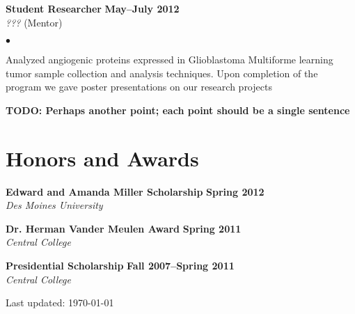 \documentclass[10pt,letterpaper]{article}
\renewenvironment{itemize}{
  \begin{list}{}{
      \setlength{\leftmargin}{1.5em}
      \setlength{\itemsep}{0.25em}
      \setlength{\parskip}{0pt}
      \setlength{\parsep}{0.25em}
    }
  }{
  \end{list}
}
\newenvironment{bitemize}{
  \begin{list}{$\bullet$}{
      \setlength{\leftmargin}{1.5em}
      \setlength{\itemsep}{0.25em}
      \setlength{\parskip}{0pt}
      \setlength{\parsep}{0.25em}
    }
  }{
  \end{list}
}
\begin{document}
\begin{itemize}
\item \textbf{Student Researcher} \hfill \textbf{May--July 2012}\\
  \textit{???} (Mentor)
  \begin{bitemize}
  \item Analyzed angiogenic proteins expressed in Glioblastoma
    Multiforme learning tumor sample collection and analysis
    techniques. Upon completion of the program we gave poster
    presentations on our research projects
  \item \textbf{TODO: Perhaps another point; each point should be a
    single sentence}
  \end{bitemize}
\end{itemize}

\section*{Honors and Awards}
\begin{itemize}
\item \textbf{Edward and Amanda Miller Scholarship} \hfill \textbf{Spring 2012}\\
  \textit{Des Moines University}
\item \textbf{Dr. Herman Vander Meulen Award} \hfill \textbf{Spring 2011}\\
  \textit{Central College}
\item \textbf{Presidential Scholarship} \hfill \textbf{Fall 2007--Spring 2011}\\
  \textit{Central College}
\end{itemize}

\medskip

\begin{center}
  \begin{small}
    Last updated: \today
  \end{small}
\end{center}
\end{document}
